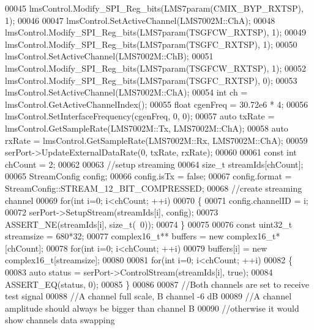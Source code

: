\begin{DoxyCode}
00045     lmsControl.Modify_SPI_Reg_bits(LMS7param(CMIX_BYP_RXTSP), 1);
00046 
00047     lmsControl.SetActiveChannel(LMS7002M::ChA);
00048     lmsControl.Modify_SPI_Reg_bits(LMS7param(TSGFCW_RXTSP), 1);
00049     lmsControl.Modify_SPI_Reg_bits(LMS7param(TSGFC_RXTSP), 1);
00050     lmsControl.SetActiveChannel(LMS7002M::ChB);
00051     lmsControl.Modify_SPI_Reg_bits(LMS7param(TSGFCW_RXTSP), 1);
00052     lmsControl.Modify_SPI_Reg_bits(LMS7param(TSGFC_RXTSP), 0);
00053     lmsControl.SetActiveChannel(LMS7002M::ChA);
00054     \textcolor{keywordtype}{int} ch = lmsControl.GetActiveChannelIndex();
00055     \textcolor{keywordtype}{float} cgenFreq = 30.72e6 * 4;
00056     lmsControl.SetInterfaceFrequency(cgenFreq, 0, 0);
00057     \textcolor{keyword}{auto} txRate = lmsControl.GetSampleRate(LMS7002M::Tx, LMS7002M::ChA);
00058     \textcolor{keyword}{auto} rxRate = lmsControl.GetSampleRate(LMS7002M::Rx, LMS7002M::ChA);
00059     serPort->UpdateExternalDataRate(0, txRate, rxRate);
00060 
00061     \textcolor{keyword}{const} \textcolor{keywordtype}{int} chCount = 2;
00062 
00063     \textcolor{comment}{//setup streaming}
00064     \textcolor{keywordtype}{size\_t} streamIds[chCount];
00065     StreamConfig config;
00066     config.isTx = \textcolor{keyword}{false};
00067     config.format = StreamConfig::STREAM\_12\_BIT\_COMPRESSED;
00068     \textcolor{comment}{//create streaming channel}
00069     \textcolor{keywordflow}{for}(\textcolor{keywordtype}{int} i=0; i<chCount; ++i)
00070     \{
00071         config.channelID = i;
00072         serPort->SetupStream(streamIds[i], config);
00073         ASSERT\_NE(streamIds[i], \textcolor{keywordtype}{size\_t}(~0));
00074     \}
00075 
00076     \textcolor{keyword}{const} uint32\_t streamsize = 680*32;
00077     complex16_t** buffers = \textcolor{keyword}{new} complex16_t*[chCount];
00078     \textcolor{keywordflow}{for}(\textcolor{keywordtype}{int} i=0; i<chCount; ++i)
00079         buffers[i] = \textcolor{keyword}{new} complex16_t[streamsize];
00080 
00081     \textcolor{keywordflow}{for}(\textcolor{keywordtype}{int} i=0; i<chCount; ++i)
00082     \{
00083         \textcolor{keyword}{auto} status = serPort->ControlStream(streamIds[i], \textcolor{keyword}{true});
00084         ASSERT\_EQ(status, 0);
00085     \}
00086 
00087     \textcolor{comment}{//Both channels are set to receive test signal}
00088     \textcolor{comment}{//A channel full scale, B channel -6 dB}
00089     \textcolor{comment}{//A channel amplitude should always be bigger than channel B}
00090     \textcolor{comment}{//otherwise it would show channels data swapping}

\end{DoxyCode}
